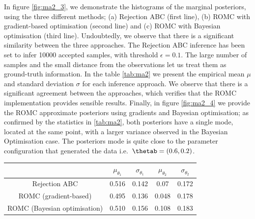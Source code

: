 In figure \ref{fig:ma2_3}, we demonstrate the histograms of the
marginal posteriors, using the three different methods; (a) Rejection
ABC (first line), (b) ROMC with gradient-based optimisation (second
line) and (c) ROMC with Bayesian optimisation (third
line). Undoubtedly, we observe that there is a significant similarity
between the three approaches. The Rejection ABC inference has been set
to infer 10000 accepted samples, with threshold $\epsilon=0.1$. The
large number of samples and the small distance from the observations
let us treat them as ground-truth information. In the table \ref{tab:ma2}
we present the empirical mean $\mu$ and standard deviation $\sigma$
for each inference approach. We observe that there is a significant
agreement between the approaches, which verifies that the ROMC
implementation provides sensible results. Finally, in figure
\ref{fig:ma2_4} we provide the ROMC approximate posteriors using
gradients and Bayesian optimisation; as confirmed by the statistics in
\ref{tab:ma2}, both posteriors have a single mode, located at the same
point, with a larger variance observed in the Bayesian Optimisation
case. The posteriors mode is quite close to the parameter
configuration that generated the data i.e.\ $\thetab = (0.6, 0.2)$.

\begin{center} \label{tab:ma2}
\begin{tabular}{ c|c|c|c|c }
\hline
& $\mu_{\theta_1}$ & $\sigma_{\theta_1}$ & $\mu_{\theta_2}$ & $\sigma_{\theta_2}$ \\
\hline \hline
Rejection ABC & 0.516 & 0.142 & 0.07 & 0.172 \\
\hline
ROMC (gradient-based) & 0.495 & 0.136 & 0.048 & 0.178 \\
\hline
ROMC (Bayesian optimisation) & 0.510 & 0.156 & 0.108 & 0.183 \\
\hline
\end{tabular}
\end{center}

